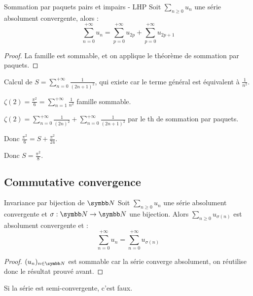 \begin{proposition}{Sommation par paquets pairs et impairs - LHP}{}
    Soit $\sum_{n \geqslant 0} u_n$ une série absolument convergente, alors :
    \[\sum_{n  = 0 }^{+\infty} u_n = \sum_{p = 0 }^{+\infty} u_{2p} + \sum_{p = 0}^{+\infty} u_{2p + 1}\]
\end{proposition}

\begin{proof}
    La famille est sommable, et on applique le théorème de sommation par paquets. 
\end{proof}

\begin{exemple}
    Calcul de $\displaystyle S = \sum_{n = 0 }^{+\infty} \frac 1 {(2n + 1)^2}$, qui existe car le terme général est équivalent à $\frac 1 {n^2}$. 

    $\displaystyle \zeta(2) = \frac{\pi^2} 6 = \sum_{n = 1}^{+\infty} \frac 1 {n^2}$ famille sommable. 

    $\displaystyle \zeta(2) = \sum_{n = 0 }^{+\infty} \frac 1 {(2n)^2} + \sum_{n = 0 }^{+\infty} \frac 1 {(2n + 1)^2}$ par le th de sommation par paquets. 

    Donc $\displaystyle \frac{\pi^2} 6 = S + \frac{\pi^2}{24}$.

    Donc $S = \frac {\pi^2} 8$.
\end{exemple}

\subsection{Commutative convergence}

\begin{theoreme}{Invariance par bijection de $\N$}{}
    Soit $\displaystyle \sum_{n \geqslant 0} u_n$ une série absolument convergente et $\sigma : \N \to \N$ une bijection.
    Alors $\displaystyle \sum_{n \geqslant 0} u_{\sigma(n)}$ est absolument convergente et :
    \[\sum_{n = 0}^{+\infty} u_n = \sum_{n = 0}^{+\infty} u_{\sigma(n)}\]
\end{theoreme}

\begin{proof}
    $(u_n)_{n \in \N}$ est sommable car la série converge absolument,
    on réutilise donc le résultat prouvé avant.
\end{proof}

\begin{remarque}
    Si la série est semi-convergente, c'est faux.
\end{remarque}

